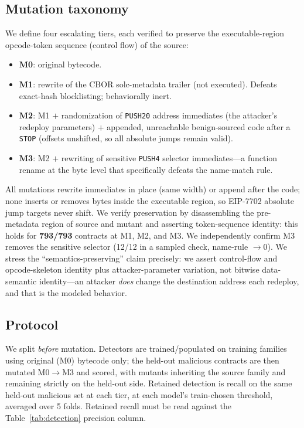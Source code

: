 \documentclass[conference]{IEEEtran}
\newcommand{\eip}{EIP-7702}
\newcommand{\code}[1]{\texttt{#1}}
\begin{document}
\subsection{Mutation taxonomy}
We define four escalating tiers, each verified to preserve the executable-region opcode-token
sequence (control flow) of the source:
\begin{itemize}
  \item \textbf{M0}: original bytecode.
  \item \textbf{M1}: rewrite of the CBOR solc-metadata trailer (not executed). Defeats
  exact-hash blocklisting; behaviorally inert.
  \item \textbf{M2}: M1 $+$ randomization of \code{PUSH20} address immediates (the attacker's
  redeploy parameters) $+$ appended, unreachable benign-sourced code after a \code{STOP}
  (offsets unshifted, so all absolute jumps remain valid).
  \item \textbf{M3}: M2 $+$ rewriting of sensitive \code{PUSH4} selector immediates---a
  function rename at the byte level that specifically defeats the name-match rule.
\end{itemize}
All mutations rewrite immediates in place (same width) or append after the code; none inserts
or removes bytes inside the executable region, so \eip{} absolute jump targets never shift. We
verify preservation by disassembling the pre-metadata region of source and mutant and asserting
token-sequence identity: this holds for \textbf{793/793} contracts at M1, M2, and M3. We
independently confirm M3 removes the sensitive selector (12/12 in a sampled check, name-rule
$\rightarrow 0$). We stress the ``semantics-preserving'' claim precisely: we assert control-flow
and opcode-skeleton identity plus attacker-parameter variation, not bitwise data-semantic
identity---an attacker \emph{does} change the destination address each redeploy, and that is the
modeled behavior.

\subsection{Protocol}
We split \emph{before} mutation. Detectors are trained/populated on training families using
original (M0) bytecode only; the held-out malicious contracts are then mutated M0$\rightarrow$M3
and scored, with mutants inheriting the source family and remaining strictly on the held-out
side. Retained detection is recall on the same held-out malicious set at each tier, at each
model's train-chosen threshold, averaged over 5 folds. Retained recall must be read against the
Table~\ref{tab:detection} precision column.
\end{document}
